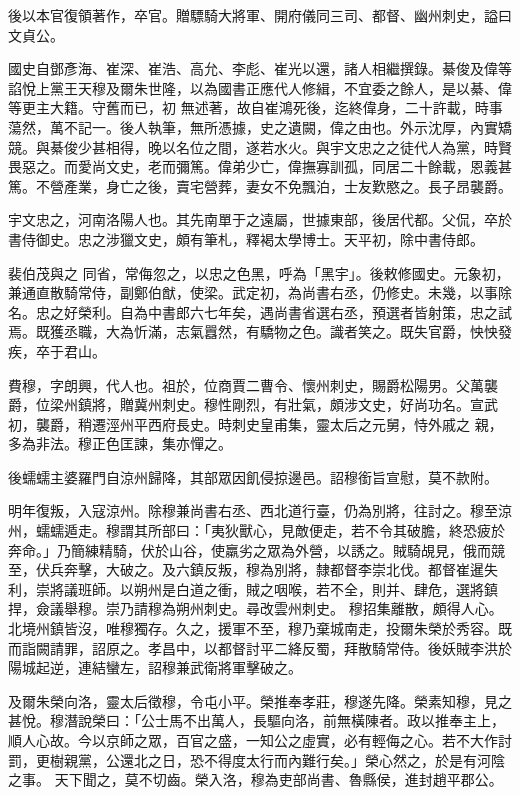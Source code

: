 \begin{pinyinscope}
 後以本官復領著作，卒官。贈驃騎大將軍、開府儀同三司、都督、幽州刺史，謚曰文貞公。



 國史自鄧彥海、崔深、崔浩、高允、李彪、崔光以還，諸人相繼撰錄。綦俊及偉等諂悅上黨王天穆及爾朱世隆，以為國書正應代人修緝，不宜委之餘人，是以綦、偉等更主大籍。守舊而已，初
 無述著，故自崔鴻死後，迄終偉身，二十許載，時事蕩然，萬不記一。後人執筆，無所憑據，史之遺闕，偉之由也。外示沈厚，內實矯競。與綦俊少甚相得，晚以名位之間，遂若水火。與宇文忠之之徒代人為黨，時賢畏惡之。而愛尚文史，老而彌篤。偉弟少亡，偉撫寡訓孤，同居二十餘載，恩義甚篤。不營產業，身亡之後，賣宅營葬，妻女不免飄泊，士友歎愍之。長子昂襲爵。



 宇文忠之，河南洛陽人也。其先南單于之遠屬，世據東部，後居代都。父侃，卒於書侍御史。忠之涉獵文史，頗有筆札，釋褐太學博士。天平初，除中書侍郎。



 裴伯茂與之
 同省，常侮忽之，以忠之色黑，呼為「黑宇」。後敕修國史。元象初，兼通直散騎常侍，副鄭伯猷，使梁。武定初，為尚書右丞，仍修史。未幾，以事除名。忠之好榮利。自為中書郎六七年矣，遇尚書省選右丞，預選者皆射策，忠之試焉。既獲丞職，大為忻滿，志氣囂然，有驕物之色。識者笑之。既失官爵，怏怏發疾，卒于君山。



 費穆，字朗興，代人也。祖於，位商賈二曹令、懷州刺史，賜爵松陽男。父萬襲爵，位梁州鎮將，贈冀州刺史。穆性剛烈，有壯氣，頗涉文史，好尚功名。宣武初，襲爵，稍遷涇州平西府長史。時刺史皇甫集，靈太后之元舅，恃外戚之
 親，多為非法。穆正色匡諫，集亦憚之。



 後蠕蠕主婆羅門自涼州歸降，其部眾因飢侵掠邊邑。詔穆銜旨宣慰，莫不款附。



 明年復叛，入寇涼州。除穆兼尚書右丞、西北道行臺，仍為別將，往討之。穆至涼州，蠕蠕遁走。穆謂其所部曰：「夷狄獸心，見敵便走，若不令其破膽，終恐疲於奔命。」乃簡練精騎，伏於山谷，使羸劣之眾為外營，以誘之。賊騎覘見，俄而競至，伏兵奔擊，大破之。及六鎮反叛，穆為別將，隸都督李崇北伐。都督崔暹失利，崇將議班師。以朔州是白道之衝，賊之咽喉，若不全，則并、肆危，選將鎮捍，僉議舉穆。崇乃請穆為朔州刺史。尋改雲州刺史。
 穆招集離散，頗得人心。北境州鎮皆沒，唯穆獨存。久之，援軍不至，穆乃棄城南走，投爾朱榮於秀容。既而詣闕請罪，詔原之。孝昌中，以都督討平二絳反蜀，拜散騎常侍。後妖賊李洪於陽城起逆，連結蠻左，詔穆兼武衛將軍擊破之。



 及爾朱榮向洛，靈太后徵穆，令屯小平。榮推奉孝莊，穆遂先降。榮素知穆，見之甚悅。穆潛說榮曰：「公士馬不出萬人，長驅向洛，前無橫陳者。政以推奉主上，順人心故。今以京師之眾，百官之盛，一知公之虛實，必有輕侮之心。若不大作討罰，更樹親黨，公還北之日，恐不得度太行而內難行矣。」榮心然之，於是有河陰之事。
 天下聞之，莫不切齒。榮入洛，穆為吏部尚書、魯縣侯，進封趙平郡公。




\end{pinyinscope}
